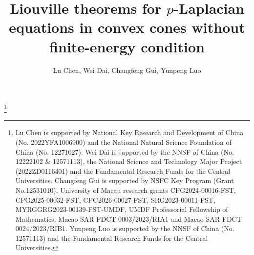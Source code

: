 \documentclass[12pt]{amsart}
\theoremstyle{definition}
\theoremstyle{remark}
\theoremstyle{conclusion}
\theoremstyle{conjecture}
\numberwithin{equation}{section}
\begin{document}
\title[Liouville theorems for $p$-Laplacian equations in convex cones]{Liouville theorems for $p$-Laplacian equations in convex cones without finite-energy condition}

\author{Lu Chen, Wei Dai, Changfeng Gui, Yunpeng Luo}


\address{Key laboratory of Algebraic Lie Theory and Analysis of Ministry of Education,
School of Mathematics and Statistics, Beijing Institute of Technology, Beijing 100081, P. R. China}

\address{School of Mathematical Sciences, Beihang University (BUAA), Beijing 100191, P. R. China, and Key Laboratory of Mathematics, Informatics and Behavioral Semantics, Ministry of Education, Beijing 100191, P. R. China}

\address{Department of Mathematics, University of Macau, Macau SAR, P. R. China}

\address{School of Mathematical Sciences, Beihang University (BUAA), Beijing 100191, P. R. China}

\thanks{Lu Chen is supported by National Key Research and Development of China (No. 2022YFA1006900) and the National Natural Science Foundation of China (No. 12271027). Wei Dai is supported by the NNSF of China (No. 12222102 \& 12571113), the National Science and Technology Major Project (2022ZD0116401) and the Fundamental Research Funds for the Central Universities. Changfeng Gui is supported by NSFC Key Program (Grant No.12531010), University of Macau research grants CPG2024-00016-FST, CPG2025-00032-FST, CPG2026-00027-FST, SRG2023-00011-FST, MYRGGRG2023-00139-FST-UMDF, UMDF Professorial Fellowship of Mathematics, Macao SAR FDCT 0003/2023/RIA1 and Macao SAR FDCT 0024/2023/RIB1. Yunpeng Luo is supported by the NNSF of China (No. 12571113) and the Fundamental Research Funds for the Central Universities.}
\end{document}
